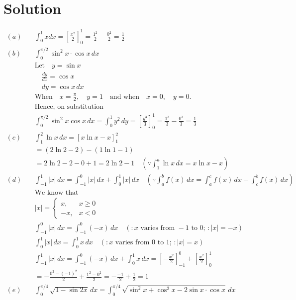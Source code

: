 \documentclass{article}
\begin{document}
\section*{Solution}

\begin{align*}
(a)\quad & \int_0^1 x dx = \left[ \frac{x^2}{2} \right]_0^1 = \frac{1^2}{2} - \frac{0^2}{2} = \frac{1}{2} \\
(b)\quad & \int_0^{\pi/2} \sin^2 x \cdot \cos x \, dx \\
& \text{Let} \quad y = \sin x \\
& \quad \frac{dy}{dx} = \cos x \\
& \quad dy = \cos x \, dx \\
& \text{When} \quad x = \frac{\pi}{2}, \quad y = 1 \quad \text{and when} \quad x = 0, \quad y = 0. \\
& \text{Hence, on substitution} \\
& \int_0^{\pi/2} \sin^2 x \cos x \, dx = \int_0^1 y^2 \, dy = \left[ \frac{y^3}{3} \right]_0^1 = \frac{1^3}{3} - \frac{0^3}{3} = \frac{1}{3} \\
(c)\quad & \int_1^2 \ln x \, dx = \left[ x \ln x - x \right]_1^2 \\
& = (2 \ln 2 - 2) - (1 \ln 1 - 1) \\
& = 2 \ln 2 - 2 - 0 + 1 = 2 \ln 2 - 1 \quad \left(\because \int_1^a \ln x \, dx = x \ln x - x \right) \\
(d)\quad & \int_{-1}^1 |x| \, dx = \int_{-1}^0 |x| \, dx + \int_0^1 |x| \, dx \quad \left(\because \int_a^b f(x) \, dx = \int_a^c f(x) \, dx + \int_c^b f(x) \, dx \right) \\
& \text{We know that} \\
& |x| = 
\begin{cases} 
x, & x \geq 0 \\
-x, & x < 0 
\end{cases} \\
& \int_{-1}^0 |x| \, dx = \int_{-1}^0 (-x) \, dx \quad (: x \text{ varies from } -1 \text{ to } 0; \, : |x| = -x) \\
& \int_0^1 |x| \, dx = \int_0^1 x \, dx \quad (: x \text{ varies from } 0 \text{ to } 1; \, : |x| = x) \\
& \int_{-1}^1 |x| \, dx = \int_{-1}^0 (-x) \, dx + \int_0^1 x \, dx = \left[ -\frac{x^2}{2} \right]_{-1}^0 + \left[ \frac{x^2}{2} \right]_0^1 \\
& = -\frac{0^2 - (-1)^2}{2} + \frac{1^2 - 0^2}{2} = -\frac{-1}{2} + \frac{1}{2} = 1 \\
(e)\quad & \int_0^{\pi/4} \sqrt{1 - \sin 2x} \, dx = \int_0^{\pi/4} \sqrt{\sin^2 x + \cos^2 x - 2 \sin x \cdot \cos x} \, dx \\

\end{align*}
\end{document}
